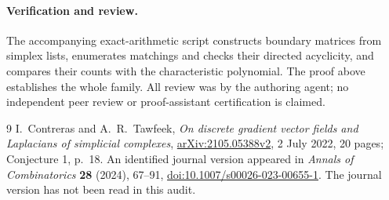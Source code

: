 \documentclass[11pt]{article}
\begin{document}
\paragraph{Verification and review.}
The accompanying exact-arithmetic script constructs boundary
matrices from simplex lists, enumerates matchings and checks
their directed acyclicity, and compares their counts with
the characteristic polynomial. The proof above establishes
the whole family. All review was by the authoring agent;
no independent peer review or proof-assistant certification
is claimed.

\begin{thebibliography}{9}
 I.~Contreras and A.~R.~Tawfeek,
\emph{On discrete gradient vector fields and Laplacians of
simplicial complexes},
\href{https://arxiv.org/abs/2105.05388v2}{arXiv:2105.05388v2},
2 July 2022, 20 pages; Conjecture 1, p.~18.
An identified journal version appeared in \emph{Annals of
Combinatorics} \textbf{28} (2024), 67--91,
\href{https://doi.org/10.1007/s00026-023-00655-1}{doi:10.1007/s00026-023-00655-1}.
The journal version has not been read in this audit.
\end{thebibliography}
\end{document}
